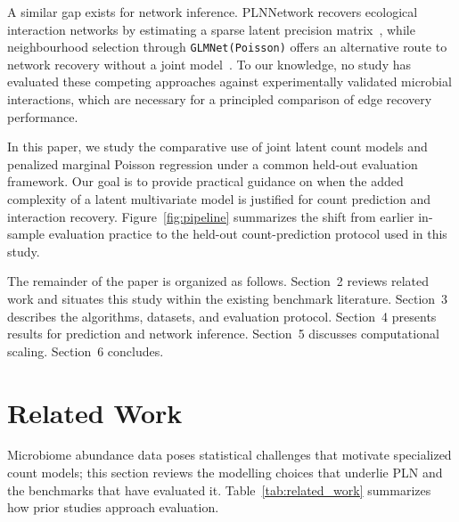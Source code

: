 \documentclass[Review,doublespace,sageh,times]{sagej}
\begin{document}
A similar gap exists for network inference.
PLNNetwork recovers ecological interaction networks by estimating a sparse latent precision matrix~\citep{chiquet2019variational}, while neighbourhood selection through \texttt{GLMNet(Poisson)} offers an alternative route to network recovery without a joint model~\citep{Meinshausen2006, Friedman2010}.
To our knowledge, no study has evaluated these competing approaches against experimentally validated microbial interactions, which are necessary for a principled comparison of edge recovery performance.

In this paper, we study the comparative use of joint latent count models and penalized marginal Poisson regression under a common held-out evaluation framework.
Our goal is to provide practical guidance on when the added complexity of a latent multivariate model is justified for count prediction and interaction recovery.
Figure~\ref{fig:pipeline} summarizes the shift from earlier in-sample evaluation practice to the held-out count-prediction protocol used in this study.

The remainder of the paper is organized as follows.
Section~2 reviews related work and situates this study within the existing benchmark literature.
Section~3 describes the algorithms, datasets, and evaluation protocol.
Section~4 presents results for prediction and network inference.
Section~5 discusses computational scaling.
Section~6 concludes.

\section{Related Work}

Microbiome abundance data poses statistical challenges that motivate specialized count models; this section reviews the modelling choices that underlie PLN and the benchmarks that have evaluated it.
Table~\ref{tab:related_work} summarizes how prior studies approach evaluation.
\end{document}
